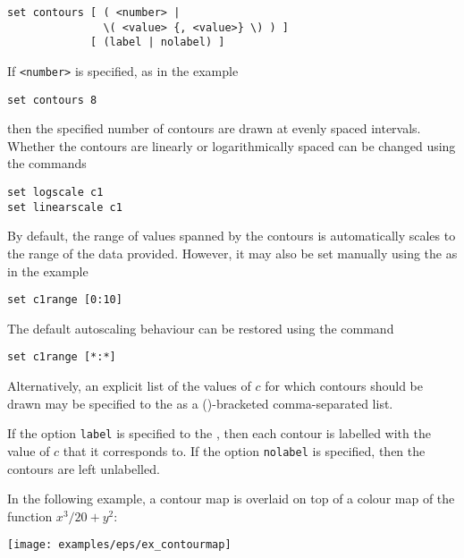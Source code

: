 \begin{verbatim}
set contours [ ( <number> |
               \( <value> {, <value>} \) ) ]
             [ (label | nolabel) ]
\end{verbatim}

If {\tt <number>} is specified, as in the example
\begin{verbatim}
set contours 8
\end{verbatim}
then the specified number of contours are drawn at evenly spaced intervals.
Whether the contours are linearly or logarithmically spaced can be changed
using the commands
\begin{verbatim}
set logscale c1
set linearscale c1
\end{verbatim}
By default, the range of values spanned by the contours is automatically scales
to the range of the data provided. However, it may also be set manually using
the  as in the example
\begin{verbatim}
set c1range [0:10]
\end{verbatim}
The default autoscaling behaviour can be restored using the command
\begin{verbatim}
set c1range [*:*]
\end{verbatim}

Alternatively, an explicit list of the values of $c$ for which contours should
be drawn may be specified to the  as a ()-bracketed
comma-separated list.

If the option {\tt label} is specified to the , then each
contour is labelled with the value of $c$ that it corresponds to. If the option
{\tt nolabel} is specified, then the contours are left unlabelled.

In the following example, a contour map is overlaid on top of a colour map of
the function $x^3/20+y^2$:

\vspace{2mm}
\newline
{}\newline
{}\newline
{}

\vspace{2mm}
\centerline{\texttt{[image: examples/eps/ex\_contourmap]}}
\vspace{2mm}

